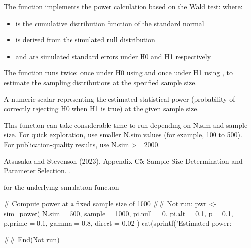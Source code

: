 \documentclass[a4paper]{book}
\begin{document}
%
\begin{Details}
The function implements the power calculation based on the Wald test:
where:
\begin{itemize}

\item{} \eqn{\Phi}{} is the cumulative distribution function of the standard normal
\item{}  is derived from the simulated null distribution
\item{}  and  are simulated standard errors
under H0 and H1 respectively

\end{itemize}


The function runs  twice: once under H0 using 
and once under H1 using , to estimate the sampling distributions
at the specified sample size.
\end{Details}
%
\begin{Value}
A numeric scalar representing the estimated statistical power
(probability of correctly rejecting H0 when H1 is true) at the given sample size.
\end{Value}
%
\begin{Note}
This function can take considerable time to run depending on N.sim and
sample size. For quick exploration, use smaller N.sim values (for example, 100 to 500).
For publication-quality results, use N.sim >= 2000.
\end{Note}
%
\begin{References}
Atsusaka and Stevenson (2023). Appendix C5: Sample Size Determination
and Parameter Selection. .
\end{References}
%
\begin{SeeAlso}
 for the underlying simulation function
\end{SeeAlso}
%
\begin{Examples}
\begin{ExampleCode}
# Compute power at a fixed sample size of 1000
## Not run: 
pwr <- sim_power(
  N.sim  = 500,
  sample = 1000,
  pi.null = 0,
  pi.alt  = 0.1,
  p       = 0.1,
  p.prime = 0.1,
  gamma   = 0.8,
  direct  = 0.02
)
cat(sprintf("Estimated power: %

## End(Not run)

\end{ExampleCode}
\end{Examples}
\end{document}

